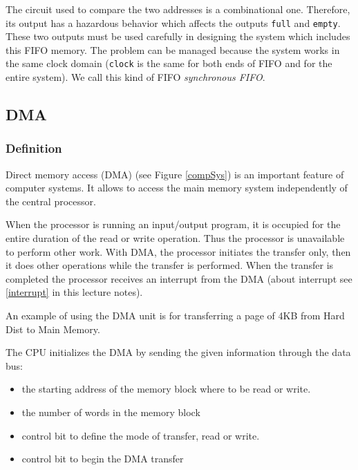 The circuit used to compare the two addresses is a combinational
one. Therefore, its output has a hazardous behavior which affects
the outputs {\tt full} and {\tt empty}. These two outputs must be
used carefully in designing the system which includes this FIFO
memory. The problem can be managed because the system works in the
same clock domain ({\tt clock} is the same for both ends of FIFO
and for the entire system). We call this kind of FIFO {\em
synchronous FIFO}.

\subsection{DMA}

\subsubsection{Definition}

Direct memory access (DMA) (see Figure \ref{compSys}) is an important feature of computer systems. It allows  to access the main memory  system independently of the central processor.

When the processor is running an input/output program, it is occupied for the entire duration of the read or write operation. Thus the processor is unavailable to perform other work. With DMA, the processor  initiates the transfer only, then it does other operations while the transfer is performed. When the transfer is completed the processor receives an interrupt from the DMA (about interrupt see \ref{interrupt} in this lecture notes).

An example of using the DMA unit is for transferring a page of 4KB from Hard Dist to Main Memory.

The CPU initializes the DMA by sending the given information through the data bus:
\begin{itemize}
    \item the starting address of the memory block where to be read or write.
    \item the number of words in the memory block
    \item control bit to define the mode of transfer, read or write.
    \item control bit to begin the DMA transfer
\end{itemize}

